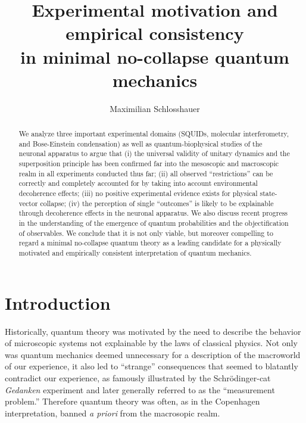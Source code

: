 \documentclass[twocolumn,aps,floatfix,amsmath,amssymb,showpacs,nofootinbib]{revtex4}
\begin{document}
\title{Experimental motivation and empirical consistency \\in minimal
  no-collapse quantum mechanics}

\author{Maximilian Schlosshauer}




\begin{abstract}
  
  We analyze three important experimental domains (SQUIDs, molecular
  interferometry, and Bose-Einstein condensation) as well as
  quantum-biophysical studies of the neuronal apparatus to argue that
  (i) the universal validity of unitary dynamics and the superposition
  principle has been confirmed far into the mesoscopic and macroscopic
  realm in all experiments conducted thus far; (ii) all observed
  ``restrictions'' can be correctly and completely accounted for by
  taking into account environmental decoherence effects; (iii) no
  positive experimental evidence exists for physical state-vector
  collapse; (iv) the perception of single ``outcomes'' is likely to be
  explainable through decoherence effects in the neuronal apparatus.
  We also discuss recent progress in the understanding of the
  emergence of quantum probabilities and the objectification of
  observables. We conclude that it is not only viable, but moreover
  compelling to regard a minimal no-collapse quantum theory as a
  leading candidate for a physically motivated and empirically
  consistent interpretation of quantum mechanics.

\end{abstract}

\maketitle


\section{Introduction}

Historically, quantum theory was motivated by the need to describe the
behavior of microscopic systems not explainable by the laws of
classical physics. Not only was quantum mechanics deemed unnecessary
for a description of the macroworld of our experience, it also led to
``strange'' consequences that seemed to blatantly contradict our
experience, as famously illustrated by the Schr\"odinger-cat {\em
  Gedanken} experiment \cite{Schrodinger:1935:gs} and later generally
referred to as the ``measurement problem.'' Therefore quantum theory
was often, as in the Copenhagen interpretation, banned {\em a priori}
from the macrosopic realm.
\end{document}
